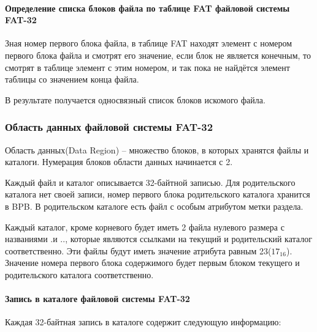 \paragraph{Определение списка блоков файла по таблице FAT файловой системы FAT-32}

Зная номер первого блока файла, в таблице FAT находят элемент с номером первого блока файла и смотрят его значение, если блок не является конечным, то смотрят в таблице элемент с этим номером, и так пока не найдётся элемент таблицы со значением конца файла.

В результате получается односвязный список блоков искомого файла.

\subsubsection{Область данных файловой системы FAT-32}

Область данных(Data Region) -- множество блоков, в которых хранятся файлы и каталоги. Нумерация блоков области данных начинается с 2.

Каждый файл и каталог описывается 32-байтной записью. Для родительского каталога нет своей записи, номер первого блока родительского каталога хранится в BPB. В родительском каталоге есть файл с особым атрибутом метки раздела.

Каждый каталог, кроме корневого будет иметь 2 файла нулевого размера с названиями \textquotedbl.\textquotedbl и \textquotedbl..\textquotedbl, которые являются ссылками на текущий и родительский каталог соответственно. Эти файлы будут иметь значение атрибута равным 23($17_{16}$). Значение номера первого блока содержимого будет первым блоком текущего и родительского каталога соответственно.

\paragraph{Запись в каталоге файловой системы FAT-32}

Каждая 32-байтная запись в каталоге содержит следующую информацию:

